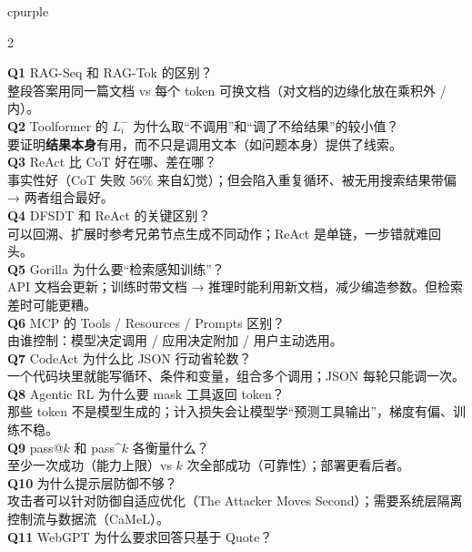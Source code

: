 \documentclass[8pt]{extarticle}
\begin{document}
\vspace{2pt}
\begin{minipage}[t]{0.625\linewidth}\vspace{0pt}
\begin{tbox}[title={自测：看完应该能回答（16 问）}]{cpurple}\normalsize\linespread{1.08}\selectfont
\begin{multicols}{2}

\textbf{Q1} RAG-Seq 和 RAG-Tok 的区别？\\
整段答案用同一篇文档 vs 每个 token 可换文档（对文档的边缘化放在乘积外 / 内）。\\[1pt]
\textbf{Q2} Toolformer 的 $L_i^-$ 为什么取“不调用”和“调了不给结果”的较小值？\\
要证明\textbf{结果本身}有用，而不只是调用文本（如问题本身）提供了线索。\\[1pt]
\textbf{Q3} ReAct 比 CoT 好在哪、差在哪？\\
事实性好（CoT 失败 56\% 来自幻觉）；但会陷入重复循环、被无用搜索结果带偏 → 两者组合最好。\\[1pt]
\textbf{Q4} DFSDT 和 ReAct 的关键区别？\\
可以回溯、扩展时参考兄弟节点生成不同动作；ReAct 是单链，一步错就难回头。\\[1pt]
\textbf{Q5} Gorilla 为什么要“检索感知训练”？\\
API 文档会更新；训练时带文档 → 推理时能利用新文档，减少编造参数。但检索差时可能更糟。\\[1pt]
\textbf{Q6} MCP 的 Tools / Resources / Prompts 区别？\\
由谁控制：模型决定调用 / 应用决定附加 / 用户主动选用。\\[1pt]
\textbf{Q7} CodeAct 为什么比 JSON 行动省轮数？\\
一个代码块里就能写循环、条件和变量，组合多个调用；JSON 每轮只能调一次。\\[1pt]
\textbf{Q8} Agentic RL 为什么要 mask 工具返回 token？\\
那些 token 不是模型生成的；计入损失会让模型学“预测工具输出”，梯度有偏、训练不稳。\\[1pt]
\textbf{Q9} pass@$k$ 和 pass\^{}$k$ 各衡量什么？\\
至少一次成功（能力上限）vs $k$ 次全部成功（可靠性）；部署更看后者。\\[1pt]
\textbf{Q10} 为什么提示层防御不够？\\
攻击者可以针对防御自适应优化（The Attacker Moves Second）；需要系统层隔离控制流与数据流（CaMeL）。\\[1pt]
\textbf{Q11} WebGPT 为什么要求回答只基于 Quote？\\

\end{multicols}
\end{tbox}
\end{minipage}
\end{document}
